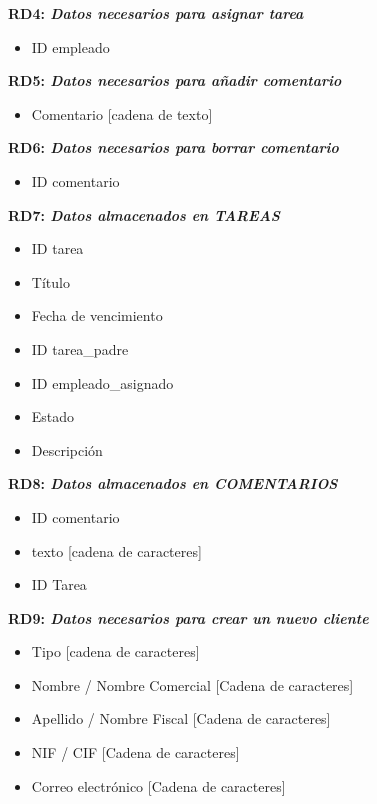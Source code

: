 \documentclass[paper=a4, fontsize=11pt, spanish]{scrartcl}
\begin{document}
\setlength{\parindent}{0em}
\textbf{RD4: \textit{Datos necesarios para asignar tarea}}
\setlength{\parindent}{2em}
\begin{itemize}
\item ID empleado
\end{itemize}

\setlength{\parindent}{0em}
\textbf{RD5: \textit{Datos necesarios para añadir comentario}}
\setlength{\parindent}{2em}
\begin{itemize}
\item Comentario [cadena de texto]
\end{itemize}

\setlength{\parindent}{0em}
\textbf{RD6: \textit{Datos necesarios para borrar comentario}}
\setlength{\parindent}{2em}
\begin{itemize}
\item ID comentario
\end{itemize}

\setlength{\parindent}{0em}
\textbf{RD7: \textit{Datos almacenados en TAREAS}}
\setlength{\parindent}{2em}
\begin{itemize}
\item ID tarea
\item Título
\item Fecha de vencimiento
\item ID tarea\_padre
\item ID empleado\_asignado
\item Estado
\item Descripción
\end{itemize}

\setlength{\parindent}{0em}
\textbf{RD8: \textit{Datos almacenados en COMENTARIOS}}
\setlength{\parindent}{2em}
\begin{itemize}
\item ID comentario
\item texto [cadena de caracteres]
\item ID Tarea
\end{itemize}

\setlength{\parindent}{0em}
\textbf{RD9: \textit{ Datos necesarios para crear un nuevo cliente}}
\setlength{\parindent}{2em}
\begin{itemize}
\item Tipo [cadena de caracteres]
\item Nombre / Nombre Comercial [Cadena de caracteres]
\item Apellido / Nombre Fiscal [Cadena de caracteres]
\item NIF / CIF [Cadena de caracteres]
\item Correo electrónico [Cadena de caracteres]
\end{itemize}
\end{document}
